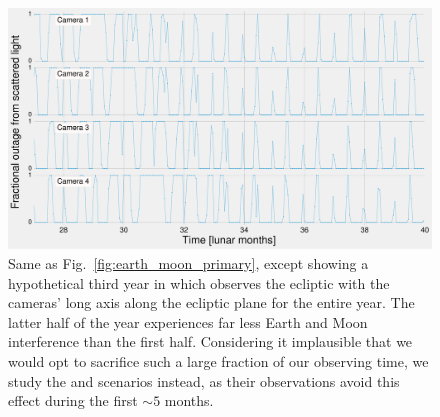 \begin{figure}[!t]
	\centering
	\includegraphics[angle=90,width=1.05\textwidth]{figures/outage_earth_moon_ecliptic_ext_panels.pdf}
	\caption{Same as Fig.~\protect\ref{fig:earth_moon_primary}, except showing 
	a hypothetical third year in which \tess observes the ecliptic with the 
	cameras' long axis along the ecliptic plane for the entire year. The latter 
	half of the year experiences far less Earth and Moon interference than the 
	first half. Considering it implausible that we would opt to sacrifice such 
	a large fraction of our observing time, we study the \elong\:and 
	\eshort\:scenarios instead, as their observations avoid this effect during 
	the first $\sim5$ months.}
	\label{fig:earth_moon_elong}
\end{figure}
